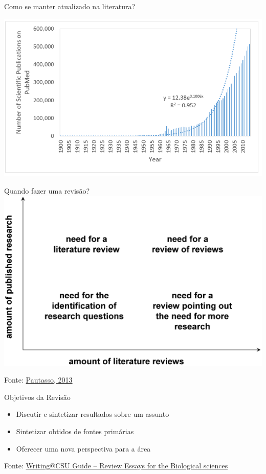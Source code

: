 \documentclass{beamer}
\begin{document}
\begin{frame}{Como se manter atualizado na literatura?}
  \begin{center}
    \includegraphics[width=1.2\textwidth]{Revisao_resumo/pubs-year}
  \end{center}
\end{frame}

\begin{frame}{Quando fazer uma revisão?}
  \includegraphics[height=0.8\textheight]{Revisao_resumo/10_dicas_revisao}

  \vfill
  \scriptsize
  \hfill Fonte: \href{https://doi.org/10.1371/journal.pcbi.1003149}{Pautasso, 2013}
\end{frame}

\begin{frame}{Objetivos da Revisão}
  \begin{itemize}
    \footnotesize
  \item Discutir e sintetizar resultados sobre um assunto
    \bigskip
  \item Sintetizar obtidos de fontes primárias
    \bigskip
  \item Oferecer uma nova perspectiva para a área
  \end{itemize}

  \vfill
  \scriptsize
  \hfill Fonte: \href{https://writing.colostate.edu/guides/guide.cfm?guideid=79}
  {\tiny Writing@CSU Guide -- Review Essays for the Biological sciences}
\end{frame}
\end{document}
